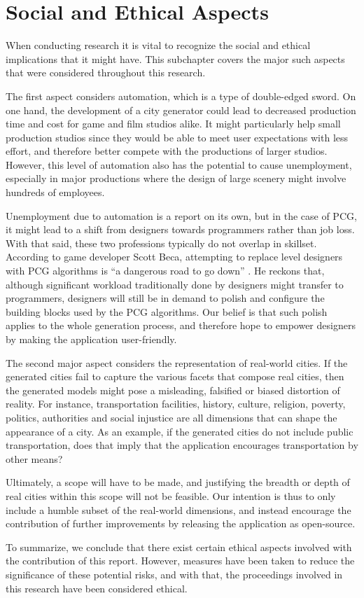 \section{Social and Ethical Aspects}

When conducting research it is vital to recognize the social and ethical implications that it might have.
This subchapter covers the major such aspects that were considered throughout this research.

The first aspect considers automation, which is a type of double-edged sword.
On one hand, the development of a city generator could lead to decreased production time and cost for game and film studios alike.
It might particularly help small production studios since they would be able to meet user expectations with less effort, and therefore better compete with the productions of larger studios.
However, this level of automation also has the potential to cause unemployment, especially in major productions where the design of large scenery might involve hundreds of employees.

Unemployment due to automation is a report on its own, but in the case of PCG, it might lead to a shift from designers towards programmers rather than job loss.
With that said, these two professions typically do not overlap in skillset.
According to game developer Scott Beca, attempting to replace level designers with PCG algorithms is ``a dangerous road to go down'' \cite{gamasutra}.
He reckons that, although significant workload traditionally done by designers might transfer to programmers, designers will still be in demand to polish and configure the building blocks used by the PCG algorithms.
Our belief is that such polish applies to the whole generation process, and therefore hope to empower designers by making the application user-friendly.

The second major aspect considers the representation of real-world cities.
If the generated cities fail to capture the various facets that compose real cities, then the generated models might pose a misleading, falsified or biased distortion of reality.
For instance, transportation facilities, history, culture, religion, poverty, politics, authorities and social injustice are all dimensions that can shape the appearance of a city.
As an example, if the generated cities do not include public transportation, does that imply that the application encourages transportation by other means?

Ultimately, a scope will have to be made, and justifying the breadth or depth of real cities within this scope will not be feasible.
Our intention is thus to only include a humble subset of the real-world dimensions, and instead encourage the contribution of further improvements by releasing the application as open-source.

To summarize, we conclude that there exist certain ethical aspects involved with the contribution of this report.
However, measures have been taken to reduce the significance of these potential risks, and with that, the proceedings involved in this research have been considered ethical.

\newpage
